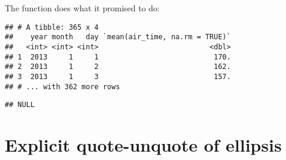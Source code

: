 \documentclass[]{book}
\newenvironment{Shaded}{\begin{snugshade}}{\end{snugshade}}
\newcommand{\ControlFlowTok}[1]{\textcolor[rgb]{0.13,0.29,0.53}{\textbf{#1}}}
\newcommand{\DataTypeTok}[1]{\textcolor[rgb]{0.13,0.29,0.53}{#1}}
\newcommand{\KeywordTok}[1]{\textcolor[rgb]{0.13,0.29,0.53}{\textbf{#1}}}
\newcommand{\NormalTok}[1]{#1}
\newcommand{\OperatorTok}[1]{\textcolor[rgb]{0.81,0.36,0.00}{\textbf{#1}}}
\newcommand{\OtherTok}[1]{\textcolor[rgb]{0.56,0.35,0.01}{#1}}
\newcommand{\StringTok}[1]{\textcolor[rgb]{0.31,0.60,0.02}{#1}}
\begin{document}
\begin{Shaded}
\end{Shaded}

The function does what it promised to do:

\begin{Shaded}
\end{Shaded}

\begin{verbatim}
## # A tibble: 365 x 4
##    year month   day `mean(air_time, na.rm = TRUE)`
##   <int> <int> <int>                          <dbl>
## 1  2013     1     1                           170.
## 2  2013     1     2                           162.
## 3  2013     1     3                           157.
## # ... with 362 more rows
\end{verbatim}

\begin{Shaded}
\end{Shaded}

\begin{verbatim}
## NULL
\end{verbatim}

\hypertarget{explicit-quote-unquote-of-ellipsis}{%
\section{Explicit quote-unquote of ellipsis}\label{explicit-quote-unquote-of-ellipsis}}
\end{document}
